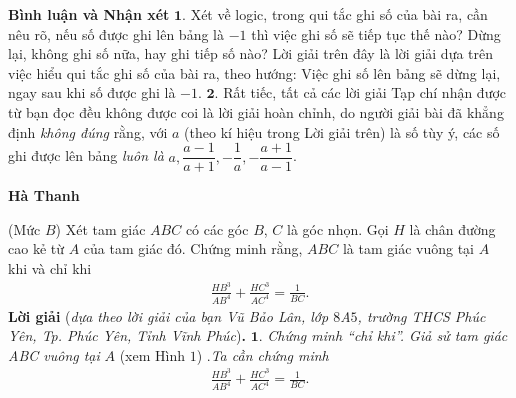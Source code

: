 \begin{multicols}{2}
	\vskip 0.05cm
	\textbf{\color{thachthuctoanhoc}Bình luận và Nhận xét}
	\vskip 0.05cm
	$\pmb{1.}$ Xét về logic, trong qui tắc ghi số của bài ra, cần nêu rõ, nếu số được ghi lên bảng là $-1$ thì việc ghi số sẽ tiếp tục thế nào? Dừng lại, không ghi số nữa, hay ghi tiếp số nào? Lời giải trên đây là lời giải dựa trên việc hiểu qui tắc ghi số của bài ra, theo hướng: Việc ghi số lên bảng sẽ dừng lại, ngay sau khi số được ghi là $-1$.
	\vskip 0.05cm
	$\pmb{2.}$ Rất tiếc, tất cả các lời giải Tạp chí nhận được từ bạn đọc đều không được coi là lời giải hoàn chỉnh, do người giải bài đã khẳng định \textit{không đúng} rằng, với $a$ (theo kí hiệu trong Lời giải trên) là số tùy ý, các số ghi được lên bảng \textit{luôn là} $a, \dfrac{a-1}{a+1}, - \dfrac{1}{a}, - \dfrac{a+1}{a-1}$.      
	\begin{flushright}
		\textbf{\color{thachthuctoanhoc}Hà Thanh}
	\end{flushright}
	{}
	(Mức $B$)
	Xét tam giác $ABC$ có các góc $B$, $C$ là góc nhọn. Gọi $H$ là chân đường cao kẻ từ $A$ của tam giác đó. Chứng minh rằng, $ABC$ là tam giác vuông tại $A$ khi và chỉ khi
	\begin{align*}
		\frac{{H{B^3}}}{{A{B^4}}} + \frac{{H{C^3}}}{{A{C^4}}} = \frac{1}{{BC}}.
	\end{align*}
	\textbf{\color{thachthuctoanhoc}Lời giải} (\textit{dựa theo lời giải của bạn Vũ Bảo Lân, lớp $8$A$5$, trường THCS Phúc Yên, Tp. Phúc Yên, Tỉnh Vĩnh Phúc})\textbf{\color{thachthuctoanhoc}.}
	\vskip 0.05cm
	$\pmb{1.}$ \textit{Chứng minh “chỉ khi”.
	Giả sử tam giác ABC vuông tại} $A$ (xem Hình $1$) .\textit{Ta cần chứng minh}
	\begin{align*}
		\frac{{H{B^3}}}{{A{B^4}}} + \frac{{H{C^3}}}{{A{C^4}}} = \frac{1}{{BC}}.
	\end{align*}                                                           
	
	

\end{multicols}
